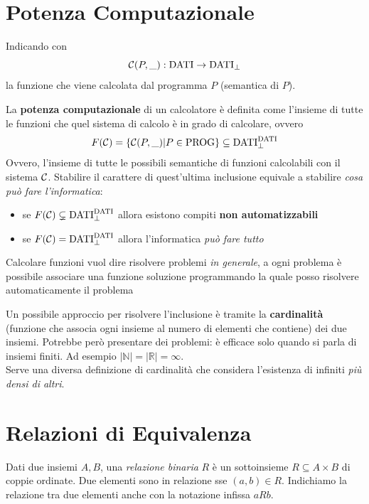\vspace{-0.25cm}

\section{Potenza Computazionale}
Indicando con 
$$ \mathcal{C} (P, \_): \text{DATI} \rightarrow \text{DATI}_{\bot} $$
la funzione che viene calcolata dal programma $P$ (semantica di $P$).

La \textbf{potenza computazionale} di un calcolatore è definita come l'insieme di tutte le funzioni che quel sistema di calcolo è in grado di calcolare, ovvero
$$ F(\mathcal{C}) = \{\mathcal{C} (P, \_) | P \in \text{PROG}\} \subseteq \text{DATI}_\bot^{\text{DATI}} $$
Ovvero, l'insieme di tutte le possibili semantiche di funzioni calcolabili con il sistema $\mathcal{C}$. Stabilire il carattere di quest'ultima inclusione equivale a stabilire \textit{cosa può fare l'informatica}:
\begin{itemize}
	\item se $F(\mathcal{C}) \subsetneq \text{DATI}_\bot^{\text{DATI}}$ allora esistono compiti \textbf{non automatizzabili}
	\item se $F(\mathcal{C}) = \text{DATI}_\bot^{\text{DATI}}$ allora l'informatica \textit{può fare tutto}
\end{itemize}

Calcolare funzioni vuol dire risolvere problemi \textit{in generale}, a ogni problema è possibile associare una funzione soluzione programmando la quale posso risolvere automaticamente il problema

Un possibile approccio per risolvere l'inclusione è tramite la \textbf{cardinalità} (funzione che associa ogni insieme al numero di elementi che contiene) dei due insiemi. Potrebbe però presentare dei problemi: è efficace solo quando si parla di insiemi finiti. Ad esempio $|\mathbb{N}| = |\mathbb{R}| = \infty$.  \\
Serve una diversa definizione di cardinalità che considera l'esistenza di infiniti \textit{più densi di altri}.

\section{Relazioni di Equivalenza}
Dati due insiemi $A,B$, una \textit{relazione binaria} $R$ è un sottoinsieme $R \subseteq A \times B$ di coppie ordinate. Due elementi sono in relazione sse $(a,b) \in R$. Indichiamo la relazione tra due elementi anche con la notazione infissa $aRb$.

